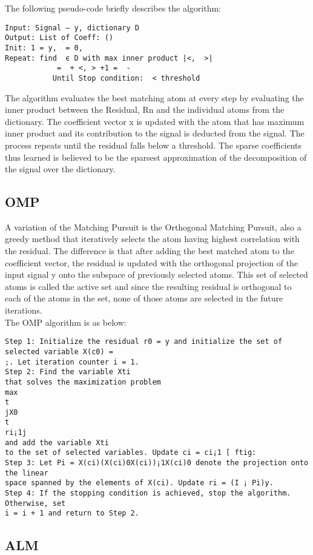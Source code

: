 \documentclass{article} %
\begin{document}
The following pseudo-code briefly describes the algorithm:
\begin{verbatim}
Input: Signal – y, dictionary D 
Output: List of Coeff: () 
Init: 1 = y,  = 0, 
Repeat: find  ϵ D with max inner product |<,  >| 
            =  + <, > +1 =  -  
           Until Stop condition:  < threshold
\end{verbatim}
           The algorithm evaluates the best matching atom at every step by evaluating the inner product between the Residual, Rn and the individual atoms from the dictionary. The coefficient vector x is updated with the atom that has maximum inner product and its contribution to the signal is deducted from the signal. The process repeats until the residual falls below a threshold. The sparse coefficients thus learned is believed to be the sparsest approximation of the decomposition of the signal over the dictionary.

\subsection{OMP}
A variation of the Matching Pursuit is the Orthogonal Matching Pursuit, also a greedy method that iteratively selects the atom having highest correlation with the residual. The difference is that after adding the best matched atom to the coefficient vector, the residual is updated with the orthogonal projection of the input signal y onto the subspace of previously selected atoms. This set of selected atoms is called the active set and since the resulting residual is orthogonal to each of the atoms in the set, none of those atoms are selected in the future iterations. \\

The OMP algorithm is as below:
\begin{verbatim}
Step 1: Initialize the residual r0 = y and initialize the set of selected variable X(c0) =
;. Let iteration counter i = 1.
Step 2: Find the variable Xti
that solves the maximization problem
max
t
jX0
t
ri¡1j
and add the variable Xti
to the set of selected variables. Update ci = ci¡1 [ ftig:
Step 3: Let Pi = X(ci)(X(ci)0X(ci))¡1X(ci)0 denote the projection onto the linear
space spanned by the elements of X(ci). Update ri = (I ¡ Pi)y.
Step 4: If the stopping condition is achieved, stop the algorithm. Otherwise, set
i = i + 1 and return to Step 2.
\end{verbatim}

  
\vspace{-.2cm}
\subsection{ALM}
\vspace{-.2cm}
\end{document}
